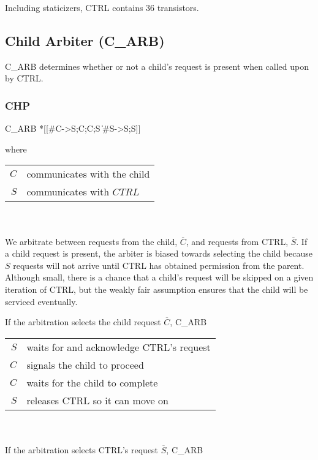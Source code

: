 \documentclass[aer.tex]{subfiles}
\begin{document}
Including staticizers, CTRL contains 36 transistors.

\subsection{Child Arbiter (C\_ARB)}
C\_ARB determines whether or not a child's request is present when called upon by CTRL.

\subsubsection{CHP}

\begin{csp}
C_ARB\equiv
  *[[#C->S;C;C;S
    \|#S->S;S]]
\end{csp}

\noindent where 

\begin{tabular}[]{rl}
  $C$ & communicates with the child \\ 
  $S$ & communicates with $CTRL$ \\
\end{tabular} \\ \\

We arbitrate between requests from the child, $\overline{C}$, and 
requests from CTRL, $\overline{S}$. If a child request is present, the arbiter is biased towards selecting the child because $S$ requests will not arrive until CTRL has obtained permission from the parent. Although small, there is a chance that a child's request will be skipped on a given iteration of CTRL, but the weakly fair assumption ensures that the child will be serviced eventually.

\noindent If the arbitration selects the child request $\overline{C}$, C\_ARB

\begin{tabular}[]{rl}
  $S$ & waits for and acknowledge CTRL's request \\
  $C$ & signals the child to proceed \\
  $C$ & waits for the child to complete \\
  $S$ & releases CTRL so it can move on \\
\end{tabular} \\ \\

\noindent If the arbitration selects CTRL's request $\overline{S}$, C\_ARB
\end{document}
